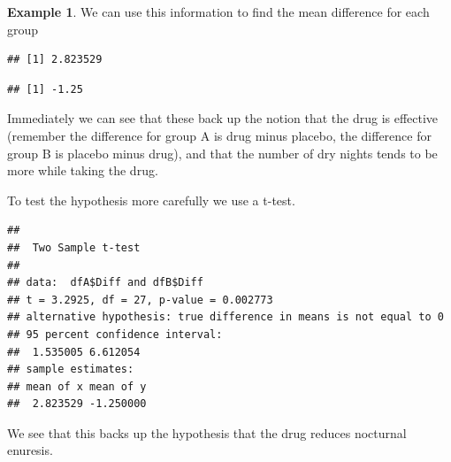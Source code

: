 \documentclass[
  openany]{book}
\newenvironment{Shaded}{\begin{snugshade}}{\end{snugshade}}
\newcommand{\AttributeTok}[1]{\textcolor[rgb]{0.13,0.29,0.53}{#1}}
\newcommand{\FunctionTok}[1]{\textcolor[rgb]{0.13,0.29,0.53}{\textbf{#1}}}
\newcommand{\NormalTok}[1]{#1}
\newcommand{\SpecialCharTok}[1]{\textcolor[rgb]{0.81,0.36,0.00}{\textbf{#1}}}
\newcommand{\StringTok}[1]{\textcolor[rgb]{0.31,0.60,0.02}{#1}}
\theoremstyle{definition}
\theoremstyle{definition}
\newtheorem{example}{Example}[chapter]
\theoremstyle{definition}
\theoremstyle{definition}
\theoremstyle{remark}
\begin{document}
\begin{example}
We can use this information to find the mean difference for each group

\begin{Shaded}
\end{Shaded}

\begin{verbatim}
## [1] 2.823529
\end{verbatim}

\begin{Shaded}
\end{Shaded}

\begin{verbatim}
## [1] -1.25
\end{verbatim}

Immediately we can see that these back up the notion that the drug is effective (remember the difference for group A is drug minus placebo, the difference for group B is placebo minus drug), and that the number of dry nights tends to be more while taking the drug.

To test the hypothesis more carefully we use a t-test.

\begin{Shaded}
\end{Shaded}

\begin{verbatim}
## 
##  Two Sample t-test
## 
## data:  dfA$Diff and dfB$Diff
## t = 3.2925, df = 27, p-value = 0.002773
## alternative hypothesis: true difference in means is not equal to 0
## 95 percent confidence interval:
##  1.535005 6.612054
## sample estimates:
## mean of x mean of y 
##  2.823529 -1.250000
\end{verbatim}

We see that this backs up the hypothesis that the drug reduces nocturnal enuresis.


\end{example}
\end{document}
